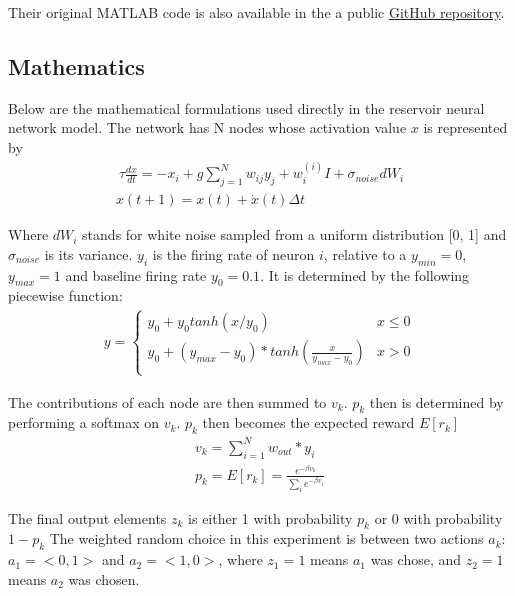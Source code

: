 \documentclass[11pt]{article}
\begin{document}
Their original MATLAB code is also available in the a public
\href{https://github.com/tyangLab/ReservoirNet_OFC_TaskState}{GitHub
repository}.

\hypertarget{mathematics}{%
\subsection{Mathematics}\label{mathematics}}

Below are the mathematical formulations used directly in the reservoir
neural network model. The network has N nodes whose activation value
\(x\) is represented by \begin{align}
\ \tau\frac{dx}{dt}= -x_i + g \sum_{j=1}^N w_{ij} y_j + w_i^{(i)}I + \sigma_{noise}dW_i \\
x(t + 1) = x(t) + \dot{x}(t)\Delta t
\end{align}

Where \(dW_i\) stands for white noise sampled from a uniform
distribution {[}0, 1{]} and \(\sigma_{noise}\) is its variance. \(y_i\)
is the firing rate of neuron \(i\), relative to a \(y_{min}=0\),
\(y_{max}=1\) and baseline firing rate \(y_0 = 0.1\). It is determined
by the following piecewise function: \begin{align}
y=   \left\{
\begin{array}{ll}
      y_0 + y_0 tanh(x/y_0) & x \leq 0   \\
      y_0 + (y_{max} - y_0)*tanh(\frac{x}{y_{max}- y_0}) & x > 0 \\
\end{array} 
\right.
\end{align}

The contributions of each node are then summed to \(v_k\). \(p_k\) then
is determined by performing a softmax on \(v_k\). \(p_k\) then becomes
the expected reward \(E[r_k]\) \begin{align}
v_k = \sum_{i=1}^N w_{out} * y_i \\
p_k = E[r_k] = \frac{e^{-\beta v_k}}{\sum_i e^{-\beta v_i}}
\end{align}

The final output elements \(z_k\) is either 1 with probability \(p_k\)
or 0 with probability \(1 - p_k\) The weighted random choice in this
experiment is between two actions \(a_k\): \(a_1=<0, 1>\) and
\(a_2=<1,0>\), where \(z_1 = 1\) means \(a_1\) was chose, and \(z_2=1\)
means \(a_2\) was chosen.
\end{document}
